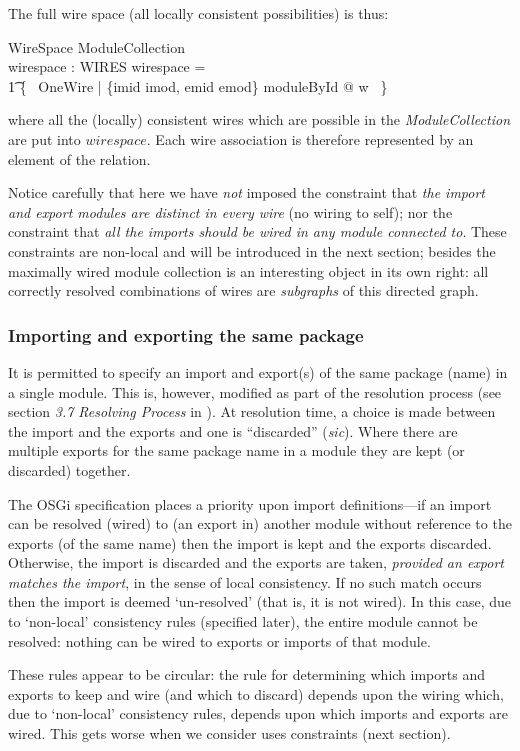 \documentclass[a4paper,12pt]{article}
\begin{document}
The full wire space (all locally consistent possibilities) is thus:
\begin{schema}{WireSpace}
	ModuleCollection \\
	wirespace : WIRES
\where
	wirespace = 	\\
	\t1 \{~ OneWire | \{imid \mapsto imod, emid \mapsto emod\} \subseteq moduleById @ w  ~\}
\end{schema}
where all the (locally) consistent wires which are possible in the \emph{ModuleCollection} are put into $wirespace$. Each wire association is therefore represented by an element of the relation.

Notice carefully that here we have \emph{not} imposed the constraint that \emph{the import and export modules are distinct in every wire} (no wiring to self); nor the constraint that \emph{all the imports should be wired in any module connected to}. These constraints are non-local and will be introduced in the next section; besides the maximally wired module collection is an interesting object in its own right: all correctly resolved combinations of wires are \emph{subgraphs} of this directed graph.

\subsubsection*{Importing and exporting the same package}
It is permitted to specify an import and export(s) of the same package (name) in a single module. This is, however, modified as part of the resolution process (see section {\it 3.7 Resolving Process} in \cite{OSGi}). At resolution time, a choice is made between the import and the exports and one is ``discarded'' (\emph{sic}). Where there are multiple exports for the same package name in a module they are kept (or discarded) together.

The OSGi specification places a priority upon import definitions---if an import can be resolved (wired) to (an export in) another module without reference to the exports (of the same name) then the import is kept and the exports discarded. Otherwise, the import is discarded and the exports are taken, {\it provided an export matches the import}, in the sense of local consistency. If no such match occurs then the import is deemed `un-resolved' (that is, it is not wired). In this case, due to `non-local' consistency rules (specified later), the entire module cannot be resolved: nothing can be wired to exports or imports of that module.

These rules appear to be circular: the rule for determining which imports and exports to keep and wire (and which to discard) depends upon the wiring which, due to `non-local' consistency rules, depends upon which imports and exports are wired. This gets worse when we consider uses constraints (next section).
\end{document}
